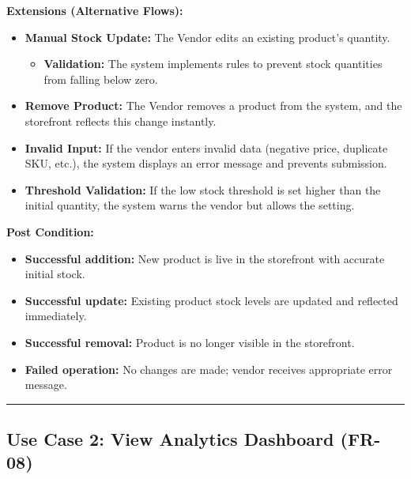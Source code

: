 \textbf{Extensions (Alternative Flows):}
\begin{itemize}
    \item[3a.] \textbf{Manual Stock Update:} The Vendor edits an existing product's quantity.
    \begin{itemize}
        \item \textbf{Validation:} The system implements rules to prevent stock quantities from falling below zero.
    \end{itemize}
    
    \item[3b.] \textbf{Remove Product:} The Vendor removes a product from the system, and the storefront reflects this change instantly.
    
    \item[4a.] \textbf{Invalid Input:} If the vendor enters invalid data (negative price, duplicate SKU, etc.), the system displays an error message and prevents submission.
    
    \item[5a.] \textbf{Threshold Validation:} If the low stock threshold is set higher than the initial quantity, the system warns the vendor but allows the setting.
\end{itemize}

\textbf{Post Condition:}
\begin{itemize}
    \item \textbf{Successful addition:} New product is live in the storefront with accurate initial stock.
    \item \textbf{Successful update:} Existing product stock levels are updated and reflected immediately.
    \item \textbf{Successful removal:} Product is no longer visible in the storefront.
    \item \textbf{Failed operation:} No changes are made; vendor receives appropriate error message.
\end{itemize}

\vspace{0.5cm}
\hrule
\vspace{0.5cm}

\subsection*{Use Case 2: View Analytics Dashboard (FR-08)}

